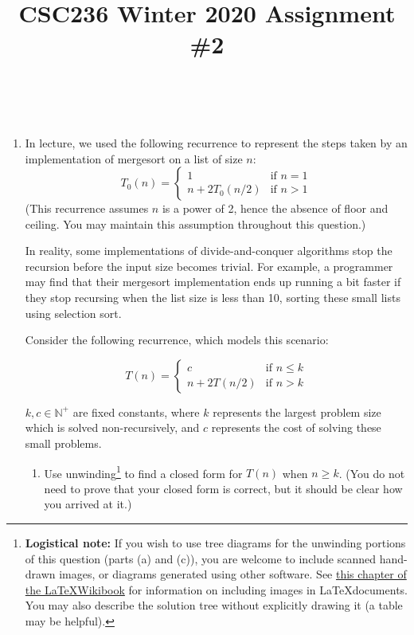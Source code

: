 \documentclass[boldsans]{article}
\title{CSC236 Winter 2020 Assignment \#2}
\author{\name \\ \textit{\utorid}}
\newcommand{\N}{\mathbb{N}}
\begin{document}
\maketitle

\begin{enumerate}

\item In lecture, we used the following recurrence to represent the steps taken by an implementation of mergesort on a list of size $n$:
\begin{equation*}
  T_0(n) = 
\begin{cases}
  1 &\text{if } n = 1 \\
  n + 2T_0(n/2) &\text{if } n > 1
\end{cases}
\end{equation*}
(This recurrence assumes $n$ is a power of 2, hence the absence of floor and ceiling. You may maintain this assumption throughout this question.)

In reality, some implementations of divide-and-conquer algorithms stop the recursion before the input size becomes trivial. For example, a programmer may find that their mergesort implementation ends up running a bit faster if they stop recursing when the list size is less than 10, sorting these small lists using selection sort.

Consider the following recurrence, which models this scenario:

\begin{equation*}
  T(n) = 
\begin{cases}
  c &\text{if } n \leq k \\
  n + 2T(n/2) &\text{if } n > k
\end{cases}
\end{equation*}

$k, c \in \N^+$ are fixed constants, where $k$ represents the largest problem size which is solved non-recursively, and $c$ represents the cost of solving these small problems.

\begin{enumerate}
\item Use unwinding\footnote{
\textbf{Logistical note:} If you wish to use tree diagrams for the unwinding portions of this question (parts (a) and (c)), you are welcome to include scanned hand-drawn images, or diagrams generated using other software. See \href{https://en.wikibooks.org/wiki/LaTeX/Importing_Graphics}{this chapter of the \LaTeX Wikibook} for information on including images in \LaTeX documents. You may also describe the solution tree without explicitly drawing it (a table may be helpful).
}
to find a closed form for $T(n)$ when $n \geq k$. (You do not need to prove that your closed form is correct, but it should be clear how you arrived at it.)


\end{enumerate}
\end{enumerate}
\end{document}
